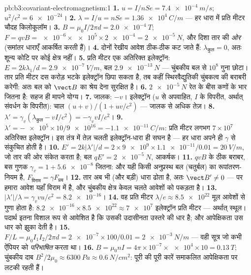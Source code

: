 \begin{solution}{pb:b3:covariant-electromagnetism:1}
\textbf{1.} $u = I/nSe = \qty{7.4e-4}{m/s}$; $u^2/c^2 =
\num{6e-24}$।
\textbf{2.} $\lambda = I/u = nSe = \qty{1.36e4}{C/m}$ --- हर धारा में
प्रति मीटर चौदह किलोकूलॉम।
\textbf{3.} $B = \mu_0I/2\pi d = \qty{2.0e-4}{T}$; $F = qvB =
\num{e-6} \times \num{e5} \times \num{2e-4} = \qty{2e-5}{N}$,
और दिशा तार की \emph{ओर} (समांतर धाराएँ आकर्षित करती हैं)।
\textbf{4.} दोनों रेखीय आवेश ठीक-ठीक कट जाते हैं: $\lambda_{\text{कुल}}
= 0$, अतः शून्य कोटि पर कोई क्षेत्र नहीं।
\textbf{5.} प्रति मीटर एक अतिरिक्त इलेक्ट्रॉन: $E = 2k\lambda_1/d =
\qty{2.9e-7}{V/m}$, बल $\qty{2.9e-13}{N}$ --- चुंबकीय बल से $10^8$ गुना
छोटा। तार प्रति मीटर दस करोड़ भटके इलेक्ट्रॉन छिपा सकता है, तब कहीं
स्थिरवैद्युतिकी चुंबकत्व की बराबरी करेगी: अतः बल को $\vect B$ का श्रेय
देना सुरक्षित है।
\textbf{6.} $\qty{2e-5}{N}$ रेत के बीस कणों के भार जितना है: सहज ही
मापने योग्य।
\textbf{7.} जालक: $-v$। इलेक्ट्रॉन ($u$ से अपवाहित, $I$ के विपरीत,
अर्थात् संवर्धन के विपरीत): चाल $(u + v)/(1 + uv/c^2)$ --- जालक से
अधिक तेज़।
\textbf{8.} $\lambda' = \gamma_v(\lambda_{\text{कुल}} - vI/c^2) =
-\gamma_v vI/c^2$।
\textbf{9.} $\lambda' = -\num{e5} \times 10/\num{9e16} =
\qty{-1.1e-11}{C/m}$: प्रति मीटर लगभग $7 \times 10^7$ अतिरिक्त
इलेक्ट्रॉन। इस तंत्र में तेज़ चलती इलेक्ट्रॉन-धारा ही सघन है
--- हर धारा अपने ही $\gamma$ से संकुचित होती है।
\textbf{10.} $E' = 2k|\lambda'|/d = 2 \times \num{9e9} \times
\num{1.1e-11}/0.01 = \qty{20}{V/m}$, जो तार की ओर संकेत करता है; बल
$qE' = \qty{2e-5}{N}$, आकर्षक।
\textbf{11.} $qvB$ के ठीक बराबर, बस गुणक $\gamma_v = 1 +
\num{5.6e-8}$ जितना: और यही किसी अनुप्रस्थ बल (चतुर्बल) का
रूपांतरण-नियम है, $F_{\text{विराम}} = \gamma F_{\text{प्रय}}$।
\textbf{12.} तार अब भी (और बड़ी) धारा ढोता है, अतः $\vect
B' \neq 0$ --- पर हमारा आवेश यहाँ विराम में है, और चुंबकीय क्षेत्र
केवल चलते आवेशों को पकड़ता है।
\textbf{13.} $|\lambda'|/\lambda = \gamma_v vu/c^2 = \num{8.2e-16}$।
\textbf{14.} वह प्रति मीटर $\lambda/e \approx \num{8.5e22}$
मूल आवेशों से गुणा होता है: $\num{8.2e-16} \times \num{8.5e22}
\approx \num{7e7}$ इलेक्ट्रॉन प्रति मीटर --- अर्थात् स्थूल। पदार्थ
इतना विशाल रूप से आवेशित है कि उसकी उदासीनता उस्तरे की धार है; और
आपेक्षिकता उस धार को झुका देती है।
\textbf{15.} $F/L = \mu_0I_1I_2/2\pi d = \num{2e-7} \times 100/0.01 =
\qty{2e-3}{N/m}$ --- वही सूत्र जो कभी ऐंपियर को \emph{परिभाषित} करता था।
\textbf{16.} $B = \mu_0nI = 4\pi\times10^{-7} \times \num{e4} \times
10 = \qty{0.13}{T}$; चुंबकीय दाब $B^2/2\mu_0 \approx
\qty{6300}{Pa} \approx \qty{0.6}{N/cm^2}$: पूरी की पूरी कारें
समाकलित आपेक्षिकता पर लटकी रहती हैं।

\end{solution}

